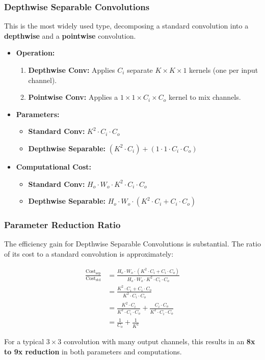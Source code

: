 \subsubsection{Depthwise Separable Convolutions}

This is the most widely used type, decomposing a standard convolution into a \textbf{depthwise} and a \textbf{pointwise} convolution.

\begin{itemize}
    \item \textbf{Operation:}
    \begin{enumerate}
        \item \textbf{Depthwise Conv:} Applies $C_i$ separate $K \times K \times 1$ kernels (one per input channel).
        \item \textbf{Pointwise Conv:} Applies a $1 \times 1 \times C_i \times C_o$ kernel to mix channels.
    \end{enumerate}
    \item \textbf{Parameters:}
    \begin{itemize}
        \item \textbf{Standard Conv:} $K^2 \cdot C_i \cdot C_o$
        \item \textbf{Depthwise Separable:} $(K^2 \cdot C_i) + (1 \cdot 1 \cdot C_i \cdot C_o)$
    \end{itemize}
    \item \textbf{Computational Cost:}
    \begin{itemize}
        \item \textbf{Standard Conv:} $H_o \cdot W_o \cdot K^2 \cdot C_i \cdot C_o$
        \item \textbf{Depthwise Separable:} $H_o \cdot W_o \cdot (K^2 \cdot C_i + C_i \cdot C_o)$
    \end{itemize}
\end{itemize}

\subsubsection{Parameter Reduction Ratio}

The efficiency gain for Depthwise Separable Convolutions is substantial. The ratio of its cost to a standard convolution is approximately:

\begin{align*}
\frac{\text{Cost}_{\text{sep}}}{\text{Cost}_{\text{std}}} 
&= \frac{H_o \cdot W_o \cdot (K^2 \cdot C_i + C_i \cdot C_o)}{H_o \cdot W_o \cdot K^2 \cdot C_i \cdot C_o} \\
&= \frac{K^2 \cdot C_i + C_i \cdot C_o}{K^2 \cdot C_i \cdot C_o} \\
&= \frac{K^2 \cdot C_i}{K^2 \cdot C_i \cdot C_o} + \frac{C_i \cdot C_o}{K^2 \cdot C_i \cdot C_o} \\
&= \frac{1}{C_o} + \frac{1}{K^2}
\end{align*}

For a typical $3\times3$ convolution with many output channels, this results in an \textbf{8x to 9x reduction} in both parameters and computations.

\newpage